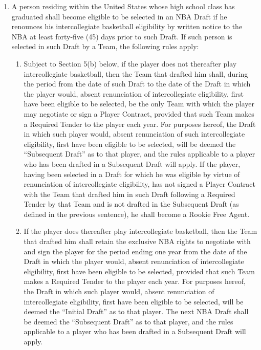 \documentclass[
]{book}
\providecommand{\tightlist}{%
  \setlength{\itemsep}{0pt}\setlength{\parskip}{0pt}}
\begin{document}
\begin{enumerate}
\def\labelenumi{(\alph{enumi})}
\tightlist
\item
  A person residing within the United States whose high school class has graduated shall become eligible to be selected in an NBA Draft if he renounces his intercollegiate basketball eligibility by written notice to the NBA at least forty-five (45) days prior to such Draft. If such person is selected in such Draft by a Team, the following rules apply:

  \begin{enumerate}
  \def\labelenumii{(\roman{enumii})}
  \tightlist
  \item
    Subject to Section 5(b) below, if the player does not thereafter play intercollegiate basketball, then the Team that drafted him shall, during the period from the date of such Draft to the date of the Draft in which the player would, absent renunciation of intercollegiate eligibility, first have been eligible to be selected, be the only Team with which the player may negotiate or sign a Player Contract, provided that such Team makes a Required Tender to the player each year. For purposes hereof, the Draft in which such player would, absent renunciation of such intercollegiate eligibility, first have been eligible to be selected, will be deemed the ``Subsequent Draft'' as to that player, and the rules applicable to a player who has been drafted in a Subsequent Draft will apply. If the player, having been selected in a Draft for which he was eligible by virtue of renunciation of intercollegiate eligibility, has not signed a Player Contract with the Team that drafted him in such Draft following a Required Tender by that Team and is not drafted in the Subsequent Draft (as defined in the previous sentence), he shall become a Rookie Free Agent.
  \item
    If the player does thereafter play intercollegiate basketball, then the Team that drafted him shall retain the exclusive NBA rights to negotiate with and sign the player for the period ending one year from the date of the Draft in which the player would, absent renunciation of intercollegiate eligibility, first have been eligible to be selected, provided that such Team makes a Required Tender to the player each year. For purposes hereof, the Draft in which such player would, absent renunciation of intercollegiate eligibility, first have been eligible to be selected, will be deemed the ``Initial Draft'' as to that player. The next NBA Draft shall be deemed the ``Subsequent Draft'' as to that player, and the rules applicable to a player who has been drafted in a Subsequent Draft will apply.

\end{enumerate}
\end{enumerate}
\end{document}
